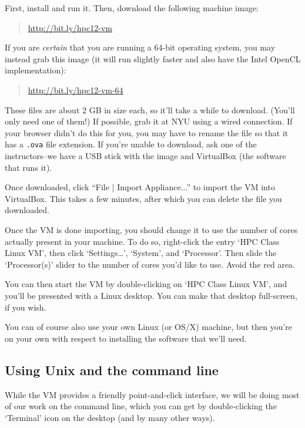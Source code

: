 \documentclass[11pt]{article}
\begin{document}
First, install  and run it.
Then, download the following machine image:
\begin{quote}
  \url{http://bit.ly/hpc12-vm}
\end{quote}
If you are \emph{certain} that you are running a 64-bit operating
system, you may instead grab this image (it will run slightly faster
and also have the Intel OpenCL implementation):
\begin{quote}
  \url{http://bit.ly/hpc12-vm-64}
\end{quote}

These files are about 2 GB in size each, so it'll take a while to download.
(You'll only need one of them!)
If possible, grab it at NYU using a wired connection.
If your browser didn't do this for you, you may have to rename the
file so that it has a \texttt{.ova} file extension.
If you're unable to download, ask one of the instructors--we have a
USB stick with the image and VirtualBox (the software that runs it).

Once downloaded, click ``File | Import Appliance...'' to import the VM
into VirtualBox.  This takes a few minutes, after which you can delete
the file you downloaded.

\begin{note}
Once the VM is done importing, you should change it to use the
number of cores actually present in your machine. To do so,
right-click the entry `HPC Class Linux VM', then click
`Settings\dots', `System', and `Processor'. Then slide the
`Processor(s)' slider to the number of cores you'd like to
use. Avoid the red area.
\end{note}

You can then start the VM by double-clicking on `HPC Class Linux VM',
and you'll be presented with a Linux desktop.  You can make that
desktop full-screen, if you wish.

You can of course also use your own Linux (or OS/X) machine, but then
you're on your own with respect to installing the software that we'll
need.

\subsection*{Using Unix and the command line}

While the VM provides a friendly point-and-click interface, we will be
doing most of our work on the command line, which you can get by
double-clicking the `Terminal' icon on the desktop (and by many other
ways).
\end{document}
